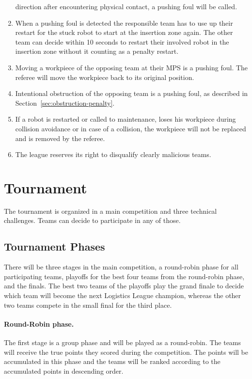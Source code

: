 \documentclass[12pt,twoside]{article}
\begin{document}
\begin{enumerate}
  direction after encountering physical contact, a pushing foul will
  be called.
\item When a pushing foul is detected the responsible team has to use
  up their restart for the stuck robot to start at the insertion zone
  again. The other team can decide within 10 seconds to restart their
  involved robot in the insertion zone without it counting as a
  penalty restart.
\item Moving a workpiece of the opposing team at their MPS is a pushing
foul. The referee will move the workpiece back to its original position.
\item Intentional obstruction of the opposing team is a pushing foul, as
described in Section~\ref{sec:obstruction-penalty}.
\item If a robot is restarted or called to maintenance, loses his
workpiece during collision avoidance or in case of a collision, the
workpiece will not be replaced and is removed by the referee.
\item The league reserves its right to disqualify clearly malicious
  teams.
\end{enumerate}

\section{Tournament}
\label{sec:tournament}
The tournament is organized in a main competition and three technical
challenges. Teams can decide to participate in any of those.

\subsection{Tournament Phases}
\label{sec:tournament-phases}
There will be three stages in the main competition, a round-robin
phase for all participating teams, playoffs for the best four teams
from the round-robin phase, and the finals. The best two teams of the
playoffs play the grand finale to decide which team will become the
next Logistics League champion, whereas the other two teams compete in
the small final for the third place.

\paragraph{Round-Robin phase.~}
The first stage is a group phase and will be played as a round-robin.
The teams will receive the true points they scored during the
competition. The points will be accumulated in this phase and the
teams will be ranked according to the accumulated points in descending
order.
\end{document}
